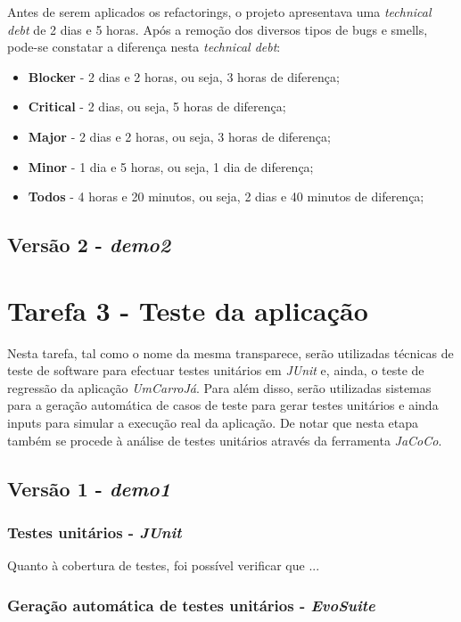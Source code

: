 \documentclass[a4paper]{report}
\begin{document}
Antes de serem aplicados os refactorings, o projeto apresentava uma \textit{technical debt} de 2 dias e 5 horas.
Após a remoção dos diversos tipos de bugs e smells, pode-se constatar a diferença nesta \textit{technical debt}:
\begin{itemize}
    \item \textbf{Blocker} - 2 dias e 2 horas, ou seja, 3 horas de diferença;
    \item \textbf{Critical} - 2 dias, ou seja, 5 horas de diferença;
    \item \textbf{Major} - 2 dias e 2 horas, ou seja, 3 horas de diferença;
    \item \textbf{Minor} - 1 dia e 5 horas, ou seja, 1 dia de diferença;
    \item \textbf{Todos} - 4 horas e 20 minutos, ou seja, 2 dias e 40 minutos de diferença;
\end{itemize}


\subsection{Versão 2 - \textit{demo2}}

\section{Tarefa 3 - Teste da aplicação}
Nesta tarefa, tal como o nome da mesma transparece, serão utilizadas técnicas de teste de software para efectuar testes unitários em \textit{JUnit} e, ainda, o
teste de regressão da aplicação \textit{UmCarroJá}. Para além disso, serão utilizadas sistemas para a geração automática de casos de teste para gerar testes unitários e ainda inputs para simular a execução real da aplicação. De notar que nesta etapa também se procede à análise de testes unitários através da ferramenta \textit{JaCoCo}.

\subsection{Versão 1 - \textit{demo1}}

\subsubsection{Testes unitários - \textit{JUnit}}

Quanto à cobertura de testes, foi possível verificar que ...

\subsubsection{Geração automática de testes unitários - \textit{EvoSuite}}
\end{document}
